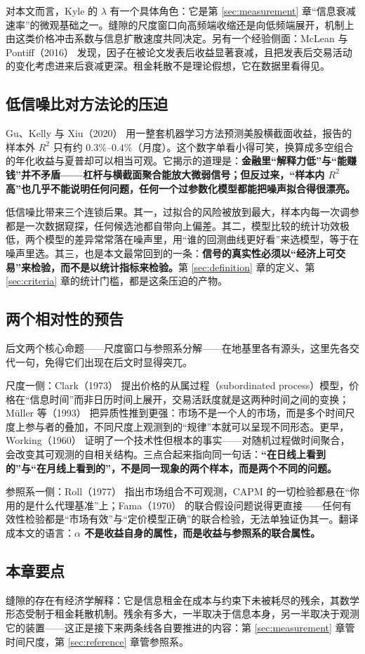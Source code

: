 对本文而言，Kyle 的 $\lambda$ 有一个具体角色：它是第 \ref{sec:measurement} 章“信息衰减速率”的微观基础之一。缝隙的尺度窗口向高频端收缩还是向低频端展开，机制上由这类价格冲击系数与信息扩散速度共同决定。另有一个经验侧面：McLean 与 Pontiff（2016）\cite{mcleanpontiff2016} 发现，因子在被论文发表后收益显著衰减，且把发表后交易活动的变化考虑进来后衰减更深。租金耗散不是理论假想，它在数据里看得见。

\subsection{低信噪比对方法论的压迫}

Gu、Kelly 与 Xiu（2020）\cite{gukellyxiu2020} 用一整套机器学习方法预测美股横截面收益，报告的样本外 $R^2$ 只有约 $0.3\%$--$0.4\%$（月度）。这个数字单看小得可笑，换算成多空组合的年化收益与夏普却可以相当可观。它揭示的道理是：\textbf{金融里“解释力低”与“能赚钱”并不矛盾——杠杆与横截面聚合能放大微弱信号；但反过来，“样本内 $R^2$ 高”也几乎不能说明任何问题，任何一个过参数化模型都能把噪声拟合得很漂亮。}

低信噪比带来三个连锁后果。其一，过拟合的风险被放到最大，样本内每一次调参都是一次数据窥探\cite{white2000}，任何候选池都自带向上偏差。其二，模型比较的统计功效极低，两个模型的差异常常落在噪声里，用“谁的回测曲线更好看”来选模型，等于在噪声里选。其三，也是本文最常回到的一条：\textbf{信号的真实性必须以“经济上可交易”来检验，而不是以统计指标来检验。}第 \ref{sec:definition} 章的定义、第 \ref{sec:criteria} 章的统计门槛，都是这条压迫的产物。

\subsection{两个相对性的预告}

后文两个核心命题——尺度窗口与参照系分解——在地基里各有源头，这里先各交代一句，免得它们出现在后文时显得突兀。

尺度一侧：Clark（1973）\cite{clark1973} 提出价格的从属过程（subordinated process）模型，价格在“信息时间”而非日历时间上展开，交易活跃度就是这两种时间之间的变换；Müller 等（1993）\cite{muller1993} 把异质性推到更强：市场不是一个人的市场，而是多个时间尺度上参与者的叠加，不同尺度上观测到的“规律”本就可以呈现不同形态。更早，Working（1960）\cite{working1960} 证明了一个技术性但根本的事实——对随机过程做时间聚合，会改变其可观测的自相关结构。三点合起来指向同一句话：\textbf{“在日线上看到的”与“在月线上看到的”，不是同一现象的两个样本，而是两个不同的问题。}

参照系一侧：Roll（1977）\cite{roll1977} 指出市场组合不可观测，CAPM 的一切检验都悬在“你用的是什么代理基准”上；Fama（1970）\cite{fama1970} 的联合假设问题说得更直接——任何有效性检验都是“市场有效”与“定价模型正确”的联合检验，无法单独证伪其一。翻译成本文的语言：\textbf{$\alpha$ 不是收益自身的属性，而是收益与参照系的联合属性。}

\subsection{本章要点}

缝隙的存在有经济学解释：它是信息租金在成本与约束下未被耗尽的残余，其数学形态受制于租金耗散机制。残余有多大，一半取决于信息本身，另一半取决于观测它的装置——这正是接下来两条线各自要推进的内容：第 \ref{sec:measurement} 章管时间尺度，第 \ref{sec:reference} 章管参照系。